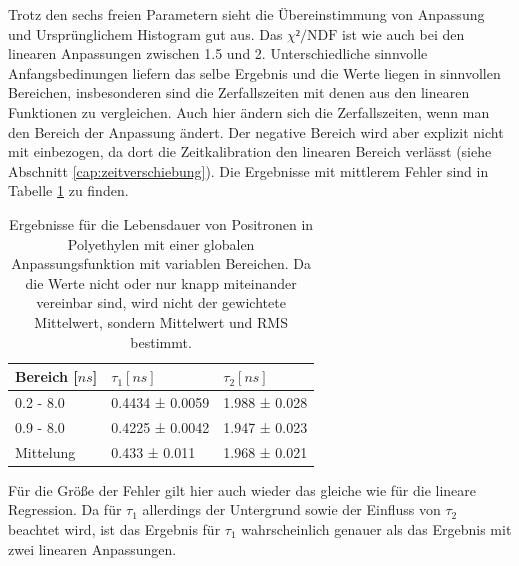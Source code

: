 \documentclass[a4paper,12pt]{article}
\begin{document}
Trotz den sechs freien Parametern sieht die Übereinstimmung von Anpassung und Ursprünglichem
Histogram gut aus. Das $χ²/\text{NDF}$ ist wie auch bei den linearen Anpassungen zwischen 1.5 und 2.
Unterschiedliche sinnvolle Anfangsbedinungen liefern das selbe Ergebnis und die Werte liegen in
sinnvollen Bereichen, insbesonderen sind die Zerfallszeiten mit denen aus den linearen Funktionen zu
vergleichen.
Auch hier ändern sich die Zerfallszeiten, wenn man den Bereich der Anpassung ändert. Der negative
Bereich wird aber explizit nicht mit einbezogen, da dort die Zeitkalibration den linearen Bereich
verlässt (siehe Abschnitt \ref{cap:zeitverschiebung}).
Die Ergebnisse mit mittlerem Fehler sind in Tabelle \ref{tab:globalPoly} zu finden.
\begin{table}[h]
	\begin{tabular}{l |l l}
		Bereich [$\si{ns}$] & $τ_1 [\si{ns}]$ & $τ_2 [\si{ns}]$ \\
		\hline
		0.2 - 8.0 & 0.4434 ± 0.0059 &1.988 ± 0.028\\
		0.9 - 8.0 & 0.4225 ± 0.0042 & 1.947 ± 0.023\\
		\hline
		\hline
		Mittelung & 0.433 ± 0.011 & 1.968 ± 0.021
	\end{tabular}
	\centering
	\caption{Ergebnisse für die Lebensdauer von Positronen in Polyethylen mit einer globalen
	Anpassungsfunktion mit variablen Bereichen. Da die Werte nicht oder nur knapp miteinander
		vereinbar sind, wird nicht der gewichtete Mittelwert, sondern Mittelwert und RMS bestimmt.}
	\label{tab:globalPoly}
\end{table}

Für die Größe der Fehler gilt hier auch wieder das gleiche wie für die lineare Regression. Da für
$τ_1$ allerdings der Untergrund sowie der Einfluss von $τ_2$ beachtet wird, ist das Ergebnis für
$τ_1$ wahrscheinlich genauer als das Ergebnis mit zwei linearen Anpassungen.
\end{document}
